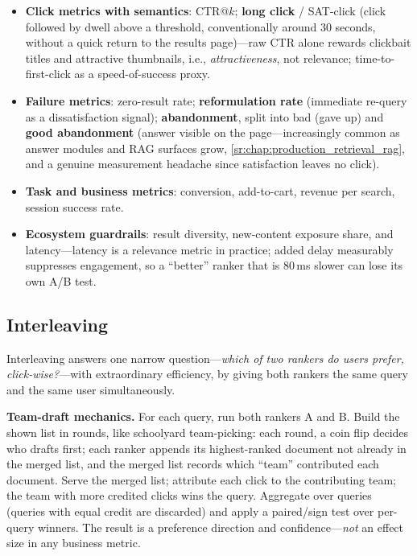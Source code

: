 \begin{itemize}
    \item \textbf{Click metrics with semantics}: CTR@$k$; \textbf{long click} / SAT-click (click followed by dwell above a threshold, conventionally around 30 seconds, without a quick return to the results page)---raw CTR alone rewards clickbait titles and attractive thumbnails, i.e., \textit{attractiveness}, not relevance; time-to-first-click as a speed-of-success proxy.
    \item \textbf{Failure metrics}: zero-result rate; \textbf{reformulation rate} (immediate re-query as a dissatisfaction signal); \textbf{abandonment}, split into bad (gave up) and \textbf{good abandonment} (answer visible on the page---increasingly common as answer modules and RAG surfaces grow, \ref{sr:chap:production_retrieval_rag}, and a genuine measurement headache since satisfaction leaves no click).
    \item \textbf{Task and business metrics}: conversion, add-to-cart, revenue per search, session success rate.
    \item \textbf{Ecosystem guardrails}: result diversity, new-content exposure share, and latency---latency is a relevance metric in practice; added delay measurably suppresses engagement, so a ``better'' ranker that is 80\,ms slower can lose its own A/B test.
\end{itemize}

\subsection{Interleaving}

Interleaving answers one narrow question---\textit{which of two rankers do users prefer, click-wise?}---with extraordinary efficiency, by giving both rankers the same query and the same user simultaneously.

\textbf{Team-draft mechanics.} For each query, run both rankers A and B. Build the shown list in rounds, like schoolyard team-picking: each round, a coin flip decides who drafts first; each ranker appends its highest-ranked document not already in the merged list, and the merged list records which ``team'' contributed each document. Serve the merged list; attribute each click to the contributing team; the team with more credited clicks wins the query. Aggregate over queries (queries with equal credit are discarded) and apply a paired/sign test over per-query winners. The result is a preference direction and confidence---\textit{not} an effect size in any business metric.

